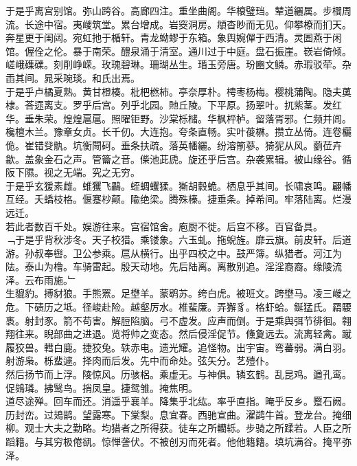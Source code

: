 \documentclass{zhvt-classic}
\begin{document}
\hspace*{2em}于是乎离宫别馆。弥山跨谷。高廊四注。重坐曲阁。华榱璧珰。辇道纚属。步櫩周流。长途中宿。夷嵕筑堂。累台增成。岩窔洞房。頫杳眇而无见。仰攀橑而扪天。奔星更于闺闼。宛虹扡于楯轩。青龙蚴蟉于东箱。象舆婉僤于西清。灵圄燕于闲馆。偓佺之伦。暴于南荣。醴泉涌于清室。通川过于中庭。盘石振崖。嵚岩倚倾。嵯峨磼礏。刻削峥嵘。玫瑰碧琳。珊瑚丛生。琘玉旁唐。玢豳文鳞。赤瑕驳荦。杂臿其间。晁采琬琰。和氏出焉。\\
\hspace*{2em}于是乎卢橘夏熟。黄甘橙楱。枇杷橪柿。亭奈厚朴。梬枣杨梅。樱桃蒲陶。隐夫薁棣。荅遝离支。罗乎后宫。列乎北园。貤丘陵。下平原。扬翠叶。扤紫茎。发红华。垂朱荣。煌煌扈扈。照曜钜野。沙棠栎槠。华枫枰栌。留落胥邪。仁频并闾。欃檀木兰。豫章女贞。长千仞。大连抱。夸条直畅。实叶葰楙。攒立丛倚。连卷欐佹。崔错癹骫。坑衡閜砢。垂条扶疏。落英幡纚。纷溶箾蔘。猗狔从风。藰莅卉歙。盖象金石之声。管籥之音。偨池茈虒。旋还乎后宫。杂袭累辑。被山缘谷。循阪下隰。视之无端。究之无穷。\\
\hspace*{2em}于是乎玄猨素雌。蜼玃飞鸓。蛭蜩蠼猱。獑胡豰蛫。栖息乎其间。长啸哀鸣。翩幡互经。夭蟜枝格。偃蹇杪颠。隃绝梁。腾殊榛。捷垂条。掉希间。牢落陆离。烂漫远迁。\\
\hspace*{2em}若此者数百千处。娱游往来。宫宿馆舍。庖厨不徙。后宫不移。百官备具。\\
\hspace*{2em}﹁于是乎背秋涉冬。天子校猎。乘镂象。六玉虬。拖蜺旌。靡云旗。前皮轩。后道游。孙叔奉辔。卫公参乘。扈从横行。出乎四校之中。鼓严簿。纵猎者。河江为阹。泰山为橹。车骑雷起。殷天动地。先后陆离。离散别追。淫淫裔裔。缘陵流泽。云布雨施。﹂\\
\hspace*{2em}生貔豹。搏豺狼。手熊罴。足壄羊。蒙鹖苏。绔白虎。被班文。跨壄马。凌三嵕之危。下碛历之坻。径峻赴险。越壑厉水。椎蜚廉。弄獬豸。格虾蛤。鋋猛氏。羂騕褭。射封豕。箭不苟害。解脰陷脑。弓不虚发。应声而倒。于是乘舆弭节徘徊。翱翔往来。睨部曲之进退。览将帅之变态。然后侵淫促节。儵夐远去。流离轻禽。蹴履狡兽。轊白鹿。捷狡兔。轶赤电。遗光耀。追怪物。出宇宙。弯蕃弱。满白羽。射游枭。栎蜚遽。择肉而后发。先中而命处。弦矢分。艺殪仆。\\
\hspace*{2em}然后扬节而上浮。陵惊风。历骇梠。乘虚无。与神俱。辚玄鹤。乱昆鸡。遒孔鸾。促鵕璘。拂鹥鸟。捎凤皇。捷鸳雏。掩焦明。\\
\hspace*{2em}道尽途殚。回车而还。消遥乎襄羊。降集乎北纮。率乎直指。晻乎反乡。蹷石阙。历封峦。过鳷鹊。望露寒。下棠梨。息宜春。西驰宣曲。濯鹢牛首。登龙台。掩细柳。观士大夫之勤略。均猎者之所得获。徒车之所轥轹。步骑之所蹂若。人臣之所蹈籍。与其穷极倦谻。惊惮詟伏。不被创刃而死者。他他籍籍。填坑满谷。掩平弥泽。\\
\end{document}
